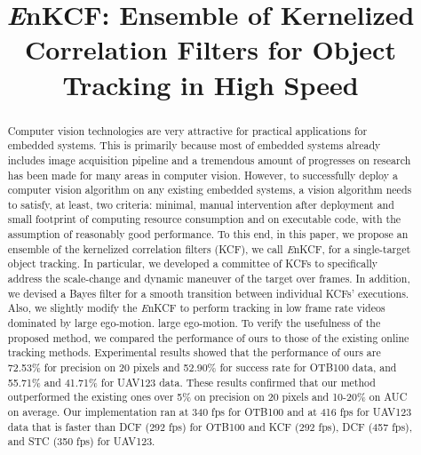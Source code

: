 \documentclass{bmvc2k}
\title{ {\it E}nKCF: Ensemble of Kernelized Correlation Filters for Object Tracking in High Speed}
\begin{document}
\maketitle

\begin{abstract}
Computer vision technologies are very attractive for practical
applications for embedded systems. This is primarily because most of
embedded systems already includes image acquisition pipeline and a
tremendous amount of progresses on research has been made for many
areas in computer vision. However, to successfully deploy a computer
vision algorithm on any existing embedded systems, a vision algorithm
needs to satisfy, at least, two criteria: minimal, manual intervention
after deployment and small footprint of computing resource consumption
and on executable code, with the assumption of reasonably good
performance. To this end, in this paper, we propose an ensemble of the
kernelized correlation filters (KCF), we call {\it E}nKCF, for a
single-target object tracking. In particular, we developed a committee
of KCFs to specifically address the scale-change and dynamic maneuver
of the target over frames. In addition, we devised a Bayes filter for
a smooth transition between individual KCFs' executions. Also, we
slightly modify the {\it E}nKCF to perform tracking in low frame rate
videos dominated by large ego-motion.  large ego-motion.  To verify
the usefulness of the proposed method, we compared the performance of
ours to those of the existing online tracking methods. Experimental
results showed that the performance of ours are 72.53\% for precision
on 20 pixels and 52.90\% for success rate for OTB100 data, and 55.71\%
and 41.71\% for UAV123 data. These results confirmed that our method
outperformed the existing ones over 5\% on precision on 20 pixels and
10-20\% on AUC on average. Our implementation ran at 340 fps for
OTB100 and at 416 fps for UAV123 data that is faster than DCF (292
fps) for OTB100 and KCF (292 fps), DCF (457 fps), and STC (350 fps)
for UAV123.
\end{abstract}

\end{document}
